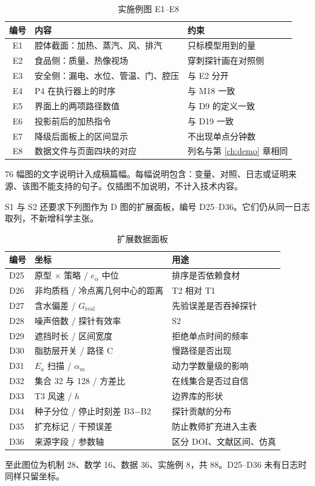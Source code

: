 \begin{table}[H]
\centering
\caption{实施例图 E1--E8}
\begin{tabularx}{\textwidth}{clX}
\toprule
编号 & 内容 & 约束 \\
\midrule
E1 & 腔体截面：加热、蒸汽、风、排汽 & 只标模型用到的量 \\
E2 & 食品侧：质量、热像视场 & 穿刺探针画在对照侧 \\
E3 & 安全侧：漏电、水位、管温、门、腔压 & 与 E2 分开 \\
E4 & P4 在执行器上的时序 & 与 M18 一致 \\
E5 & 界面上的两项路径数值 & 与 D9 的定义一致 \\
E6 & 投影前后的加热指令 & 与 D19 一致 \\
E7 & 降级后面板上的区间显示 & 不出现单点分钟数 \\
E8 & 数据文件与页面四块的对应 & 列名与第 \ref{ch:demo} 章相同 \\
\bottomrule
\end{tabularx}
\end{table}

76 幅图的文字说明计入成稿篇幅。每幅说明包含：变量、对照、日志或证明来源、该图不能支持的句子。仅插图不加说明，不计入技术内容。

S1 与 S2 还要求下列图作为 D 图的扩展面板，编号 D25--D36。它们仍从同一日志取列，不新增科学主张。

\begin{table}[H]
\centering
\caption{扩展数据面板}
\begin{tabularx}{\textwidth}{llX}
\toprule
编号 & 坐标 & 用途 \\
\midrule
D25 & 原型 $\times$ 策略 / $e_{\alpha}$ 中位 & 排序是否依赖食材 \\
D26 & 非均质档 / 冷点离几何中心的距离 & T2 相对 T1 \\
D27 & 含水偏差 / $G_{\mathrm{real}}$ & 先验误差是否吞掉探针 \\
D28 & 噪声倍数 / 探针有效率 & S2 \\
D29 & 遮挡时长 / 区间宽度 & 拒绝单点时间的频率 \\
D30 & 脂肪层开关 / 路径 C & 慢路径是否出现 \\
D31 & $E_a$ 扫描 / $\alpha_m$ & 动力学数量级的影响 \\
D32 & 集合 32 与 128 / 方差比 & 在线集合是否过自信 \\
D33 & T3 风速 / $h$ & 边界库的形状 \\
D34 & 种子分位 / 停止时刻差 B3$-$B2 & 探针贡献的分布 \\
D35 & 扩充标记 / 干预误差 & 防止教师扩充进入主表 \\
D36 & 来源字段 / 参数轴 & 区分 DOI、文献区间、仿真 \\
\bottomrule
\end{tabularx}
\end{table}

至此图位为机制 28、数学 16、数据 36、实施例 8，共 88。D25--D36 未有日志时同样只留坐标。
